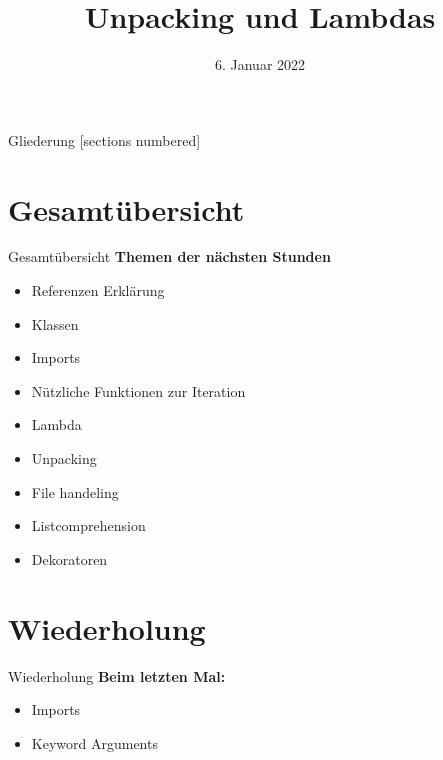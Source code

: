 



\title{Unpacking und Lambdas}
\date{6. Januar 2022}


	
\maketitle

\begin{frame}{Gliederung}
	[sections numbered]
	\tableofcontents
\end{frame}

\section*{Gesamtübersicht}
\begin{frame}{Gesamtübersicht}
	\textbf{Themen der nächsten Stunden}
	\begin{itemize}
		\item Referenzen Erklärung
		\item  Klassen
		\item Imports
		\item Nützliche Funktionen zur Iteration
		\item \alert{Lambda}
		\item \alert{Unpacking}
		\item File handeling
		\item Listcomprehension
		\item Dekoratoren
	\end{itemize}
\end{frame}

\section{Wiederholung}
\begin{frame}{Wiederholung}
	\textbf{Beim letzten Mal:}
	\begin{itemize}
		\item Imports
		
		
		\item Keyword Arguments
		
	\end{itemize}	
\end{frame}

